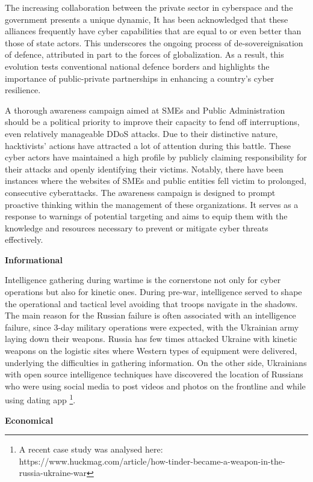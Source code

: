 The increasing collaboration between the private sector in cyberspace and the government presents a unique dynamic, It has been acknowledged that these alliances frequently have cyber capabilities that are equal to or even better than those of state actors. This underscores the ongoing process of de-sovereignisation of defence, attributed in part to the forces of globalization. As a result, this evolution tests conventional national defence borders and highlights the importance of public-private partnerships in enhancing a country's cyber resilience.

A thorough awareness campaign aimed at SMEs and Public Administration should be a political priority to improve their capacity to fend off interruptions, even relatively manageable DDoS attacks. Due to their distinctive nature, hacktivists' actions have attracted a lot of attention during this battle. These cyber actors have maintained a high profile by publicly claiming responsibility for their attacks and openly identifying their victims. Notably, there have been instances where the websites of SMEs and public entities fell victim to prolonged, consecutive cyberattacks. The awareness campaign is designed to prompt proactive thinking within the management of these organizations. It serves as a response to warnings of potential targeting and aims to equip them with the knowledge and resources necessary to prevent or mitigate cyber threats effectively.

\textbf{Informational}

Intelligence gathering during wartime is the cornerstone not only for cyber operations but also for kinetic ones. During pre-war, intelligence served to shape the operational and tactical level avoiding that troops navigate in the shadows. The main reason for the Russian failure is often associated with an intelligence failure, since 3-day military operations were expected, with the Ukrainian army laying down their weapons. Russia has few times attacked Ukraine with kinetic weapons on the logistic sites where Western types of equipment were delivered, underlying the difficulties in gathering information. On the other side, Ukrainians with open source intelligence techniques have discovered the location of Russians who were using social media to post videos and photos on the frontline and while using dating app \footnote{A recent case study was analysed here: https://www.huckmag.com/article/how-tinder-became-a-weapon-in-the-russia-ukraine-war}.

\textbf{Economical}

